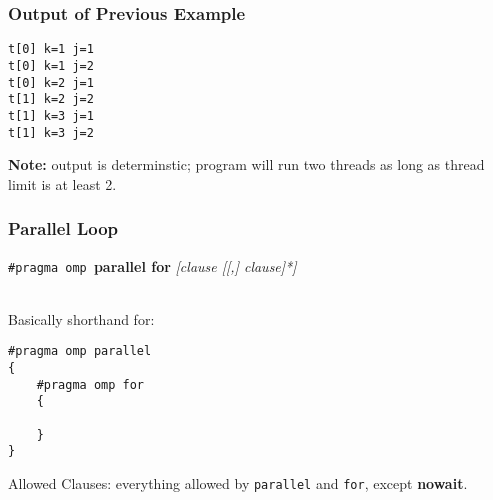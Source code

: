 \documentclass[aspectratio=43]{beamer}
\newenvironment{changemargin}[1]{%
  \begin{list}{}{%
    \setlength{\topsep}{0pt}%
    \setlength{\leftmargin}{#1}%
    \setlength{\rightmargin}{1em}
    \setlength{\listparindent}{\parindent}%
    \setlength{\itemindent}{\parindent}%
    \setlength{\parsep}{\parskip}%
  }%
  \item[]}{\end{list}}
\begin{document}
\begin{frame}[fragile]
  \frametitle{Output of Previous Example}

  \begin{changemargin}{2.5cm}

  \begin{lstlisting}
t[0] k=1 j=1
t[0] k=1 j=2
t[0] k=2 j=1
t[1] k=2 j=2
t[1] k=3 j=1
t[1] k=3 j=2
  \end{lstlisting}
  \vfill
  {\bf Note:} output is determinstic; program will run two threads as
  long as thread limit is at least 2.
  \end{changemargin}

\end{frame}

\begin{frame}[fragile]
  \frametitle{Parallel Loop}

  \begin{changemargin}{2.5cm}
  \begin{center}
    {\tt \#pragma omp }{\bf parallel for} {\it [clause [[,] clause]*]}
  \end{center}~\\

  Basically shorthand for:
  
  \begin{lstlisting}
#pragma omp parallel
{
    #pragma omp for
    {

    }
}
  \end{lstlisting}

  Allowed Clauses: everything allowed by {\tt parallel} and {\tt for}, except
  {\bf nowait}.
  \end{changemargin}

\end{frame}
\end{document}
